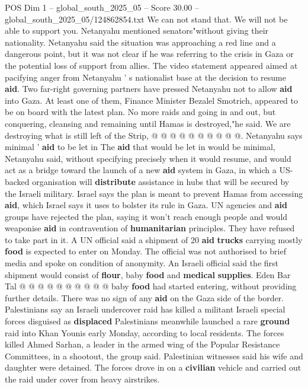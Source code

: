 \begin{textsample}{POS Dim 1 – global\_south\_2025\_05 – Score 30.00 – global\_south\_2025\_05/124862854.txt}
We can not stand that.
We will not be able to support you.
Netanyahu mentioned senators"without giving their nationality.
Netanyahu said the situation was approaching a red line and a dangerous point, but it was not clear if he was referring to the crisis in Gaza or the potential loss of support from allies.
The video statement appeared aimed at pacifying anger from Netanyahu ' s nationalist base at the decision to resume \textbf{aid}.
Two far-right governing partners have pressed Netanyahu not to allow \textbf{aid} into Gaza.
At least one of them, Finance Minister Bezalel Smotrich, appeared to be on board with the latest plan.
No more raids and going in and out, but conquering, cleansing and remaining until Hamas is destroyed,"he said.
We are destroying what is still left of the Strip, @ @ @ @ @ @ @ @ @ @.
Netanyahu says minimal ' \textbf{aid} to be let in The \textbf{aid} that would be let in would be minimal, Netanyahu said, without specifying precisely when it would resume, and would act as a bridge toward the launch of a new \textbf{aid} system in Gaza, in which a US-backed organisation will \textbf{distribute} assistance in hubs that will be secured by the Israeli military.
Israel says the plan is meant to prevent Hamas from accessing \textbf{aid}, which Israel says it uses to bolster its rule in Gaza.
UN agencies and \textbf{aid} groups have rejected the plan, saying it won't reach enough people and would weaponise \textbf{aid} in contravention of \textbf{humanitarian} principles.
They have refused to take part in it.
A UN official said a shipment of 20 \textbf{aid} \textbf{trucks} carrying mostly \textbf{food} is expected to enter on Monday.
The official was not authorised to brief media and spoke on condition of anonymity.
An Israeli official said the first shipment would consist of \textbf{flour}, baby \textbf{food} and \textbf{medical} \textbf{supplies}.
Eden Bar Tal @ @ @ @ @ @ @ @ @ @ baby \textbf{food} had started entering, without providing further details.
There was no sign of any \textbf{aid} on the Gaza side of the border.
Palestinians say an Israeli undercover raid has killed a militant Israeli special forces disguised as \textbf{displaced} Palestinians meanwhile launched a rare \textbf{ground} raid into Khan Younis early Monday, according to local residents.
The forces killed Ahmed Sarhan, a leader in the armed wing of the Popular Resistance Committees, in a shootout, the group said.
Palestinian witnesses said his wife and daughter were detained.
The forces drove in on a \textbf{civilian} vehicle and carried out the raid under cover from heavy airstrikes.

\end{textsample}
